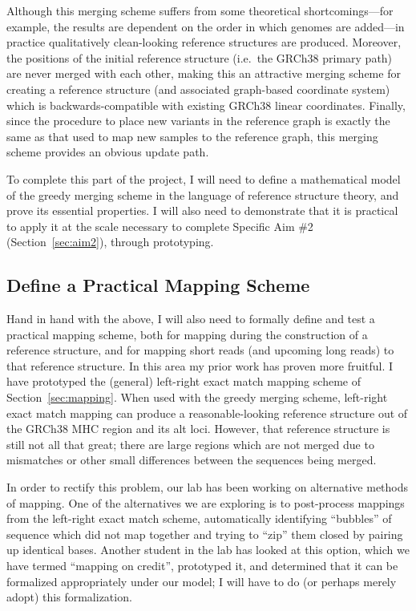 \documentclass[11pt,proposal]{ucthesis}
\begin{document}
Although this merging scheme suffers from some theoretical shortcomings---for example, the results are dependent on the order in which genomes are added---in practice qualitatively clean-looking reference structures are produced. Moreover, the positions of the initial reference structure (i.e.\ the GRCh38 primary path) are never merged with each other, making this an attractive merging scheme for creating a reference structure (and associated graph-based coordinate system) which is backwards-compatible with existing GRCh38 linear coordinates. Finally, since the procedure to place new variants in the reference graph is exactly the same as that used to map new samples to the reference graph, this merging scheme provides an obvious update path.

To complete this part of the project, I will need to define a mathematical model of the greedy merging scheme in the language of reference structure theory, and prove its essential properties. I will also need to demonstrate that it is practical to apply it at the scale necessary to complete Specific Aim \#2 (Section~\ref{sec:aim2}), through prototyping.

\subsection{Define a Practical Mapping Scheme}
\label{subsec:aim1mapping}

Hand in hand with the above, I will also need to formally define and test a practical mapping scheme, both for mapping during the construction of a reference structure, and for mapping short reads (and upcoming long reads) to that reference structure. In this area my prior work has proven more fruitful. I have prototyped the (general) left-right exact match mapping scheme of Section~\ref{sec:mapping}. When used with the greedy merging scheme, left-right exact match mapping can produce a reasonable-looking reference structure out of the GRCh38 MHC region and its alt loci. However, that reference structure is still not all that great; there are large regions which are not merged due to mismatches or other small differences between the sequences being merged.

In order to rectify this problem, our lab has been working on alternative methods of mapping. One of the alternatives we are exploring is to post-process mappings from the left-right exact match scheme, automatically identifying ``bubbles'' of sequence which did not map together and trying to ``zip'' them closed by pairing up identical bases. Another student in the lab has looked at this option, which we have termed ``mapping on credit'', prototyped it, and determined that it can be formalized appropriately under our model; I will have to do (or perhaps merely adopt) this formalization.
\end{document}
